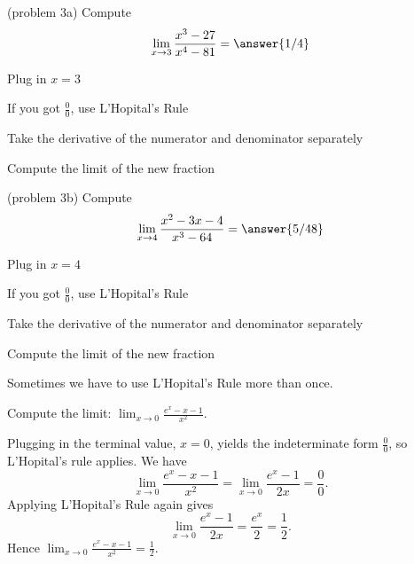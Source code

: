 \documentclass{ximera}
\begin{document}
\begin{problem}(problem 3a)
  Compute
  \[
  \lim_{x \to 3} \frac{x^3 - 27}{x^4 - 81} = \answer{1/4}
  \]
  
    \begin{hint}
      Plug in $x=3$
    \end{hint}
    \begin{hint}
      If you got $\frac00$, use L'Hopital's Rule
    \end{hint}
    \begin{hint}
      Take the derivative of the numerator and denominator separately
    \end{hint}
	  \begin{hint}
      Compute the limit of the new fraction
    \end{hint}
  
\end{problem}


\begin{problem}(problem 3b)
  Compute
  \[
  \lim_{x \to 4} \frac{x^2 - 3x - 4}{x^3 - 64} = \answer{5/48}
  \]
  
    \begin{hint}
      Plug in $x=4$
    \end{hint}
    \begin{hint}
      If you got $\frac00$, use L'Hopital's Rule
    \end{hint}
    \begin{hint}
      Take the derivative of the numerator and denominator separately
    \end{hint}
	  \begin{hint}
      Compute the limit of the new fraction
    \end{hint}
  
\end{problem}


Sometimes we have to use L'Hopital's Rule more than once.

\begin{example}[example 4]
Compute the limit: \quad $\displaystyle{\lim_{x \to 0} \frac{e^x - x - 1}{x^2}}.$

Plugging in the terminal value, $x=0$, yields 
the indeterminate form $\frac00$, so L'Hopital's rule applies.
We have 
\[\lim_{x \to 0} \frac{e^x - x - 1}{x^2} = \lim_{x \to 0} \frac{e^x -1}{2x} = \frac{0}{0}.\]
Applying L'Hopital's Rule again gives
\[\lim_{x \to 0} \frac{e^x -1}{2x} = \frac{e^x}{2} = \frac{1}{2}.\]
Hence $\displaystyle{\lim_{x \to 0} \frac{e^x - x - 1}{x^2} = \frac 12}.$
\end{example}
\end{document}
